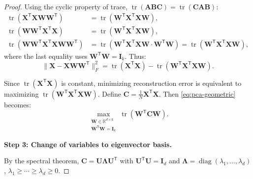 \begin{proof}
  Using the cyclic property of trace, $\operatorname{tr}(\mathbf{A}\mathbf{B}\mathbf{C}) = \operatorname{tr}(\mathbf{C}\mathbf{A}\mathbf{B})$:
  \begin{align*}
    \operatorname{tr}(\mathbf{X}^{\mathsf{T}}\mathbf{X}\mathbf{W}\mathbf{W}^{\mathsf{T}})                                  & = \operatorname{tr}(\mathbf{W}^{\mathsf{T}}\mathbf{X}^{\mathsf{T}}\mathbf{X}\mathbf{W}),                                                                                                                                 \\
    \operatorname{tr}(\mathbf{W}\mathbf{W}^{\mathsf{T}}\mathbf{X}^{\mathsf{T}}\mathbf{X})                                  & = \operatorname{tr}(\mathbf{W}^{\mathsf{T}}\mathbf{X}^{\mathsf{T}}\mathbf{X}\mathbf{W}),                                                                                                                                 \\
    \operatorname{tr}(\mathbf{W}\mathbf{W}^{\mathsf{T}}\mathbf{X}^{\mathsf{T}}\mathbf{X}\mathbf{W}\mathbf{W}^{\mathsf{T}}) & = \operatorname{tr}(\mathbf{W}^{\mathsf{T}}\mathbf{X}^{\mathsf{T}}\mathbf{X}\mathbf{W} \cdot \mathbf{W}^{\mathsf{T}}\mathbf{W}) = \operatorname{tr}(\mathbf{W}^{\mathsf{T}}\mathbf{X}^{\mathsf{T}}\mathbf{X}\mathbf{W}),
  \end{align*}
  where the last equality uses $\mathbf{W}^{\mathsf{T}}\mathbf{W} = \mathbf{I}_k$. Thus:
  \[
    \|\mathbf{X} - \mathbf{X}\mathbf{W}\mathbf{W}^{\mathsf{T}}\|_F^2 = \operatorname{tr}(\mathbf{X}^{\mathsf{T}}\mathbf{X}) - \operatorname{tr}(\mathbf{W}^{\mathsf{T}}\mathbf{X}^{\mathsf{T}}\mathbf{X}\mathbf{W}).
  \]

  Since $\operatorname{tr}(\mathbf{X}^{\mathsf{T}}\mathbf{X})$ is constant, minimizing reconstruction error is equivalent to maximizing $\operatorname{tr}(\mathbf{W}^{\mathsf{T}}\mathbf{X}^{\mathsf{T}}\mathbf{X}\mathbf{W})$.
  Define $\mathbf{C} = \frac{1}{N}\mathbf{X}^{\mathsf{T}}\mathbf{X}$. Then \eqref{eq:pca-geometric} becomes:
  \[
    \max_{\substack{\mathbf{W} \in \mathbb{R}^{d \times k} \\ \mathbf{W}^{\mathsf{T}}\mathbf{W} = \mathbf{I}_k}} \operatorname{tr}(\mathbf{W}^{\mathsf{T}}\mathbf{C}\mathbf{W}).
  \]

  \textbf{Step 3: Change of variables to eigenvector basis.}

  By the spectral theorem, $\mathbf{C} = \mathbf{U}\mathbf{\Lambda}\mathbf{U}^{\mathsf{T}}$ with $\mathbf{U}^{\mathsf{T}}\mathbf{U} = \mathbf{I}_d$ and $\mathbf{\Lambda} = \operatorname{diag}(\lambda_1,\dots,\lambda_d)$, $\lambda_1 \geq \cdots \geq \lambda_d \geq 0$.


\end{proof}

